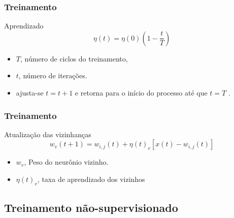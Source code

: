 \documentclass[10pt]{beamer} %
\begin{document}
\begin{frame}
	\frametitle{Treinamento}
	\begin{block}{Aprendizado}
		\begin{equation}
		\eta(t)=\eta(0)    ( 1 -  \frac{t}{T}  )  \nonumber
		\label{aprendizado}
		\end{equation}
	\end{block}
	\begin{itemize}
		\pause
		\item $T$, número de ciclos do treinamento,
		\pause
		\item $t$, número de iterações.
		\pause
		\item ajusta-se $t=t+1$ e retorna para o início do processo até que $t=T$ \citep{YANG2009,Yan2014}.
	\end{itemize}
\end{frame}

\begin{frame}
	\frametitle{Treinamento}
	\begin{block}{Atualização das vizinhanças}
		\begin{equation}
		w_{v}(t+1)=w_{i,j}(t)+\eta(t)_{v}[x(t)-w_{i,j}(t)] \nonumber
		\label{ajuste de pesos}
		\end{equation}
	\end{block}
	\begin{itemize}
		\pause
		\item $w_{v}$, Peso do neurônio vizinho. %
		\pause
		\item $\eta(t)_{v}$, taxa de aprendizado dos vizinhos%
		\pause
	\end{itemize}
\end{frame}

\subsection{Treinamento não-supervisionado}
\end{document}

